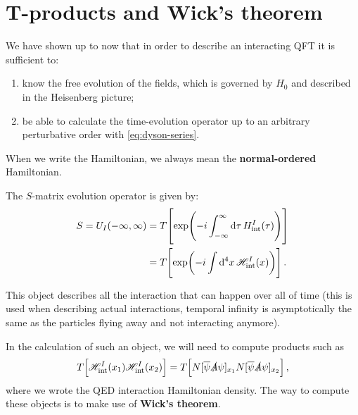 \documentclass[main.tex]{subfiles}
\begin{document}
\section{T-products and Wick's theorem}


We have shown up to now that in order to describe an interacting QFT it is sufficient to: 
\begin{enumerate}
    \item know the free evolution of the fields, which is governed by \(H_0 \) and described in the Heisenberg picture;
    \item be able to calculate the time-evolution operator up to an arbitrary perturbative order with \eqref{eq:dyson-series}. 
\end{enumerate}

When we write the Hamiltonian, we always mean the \textbf{normal-ordered} Hamiltonian. 

\begin{definition}
The \(S\)-matrix evolution operator is given by:
%
\begin{subequations} \label{eq:s-matrix}
\begin{align}
S = U_I (- \infty , \infty )
&= T \qty[\exp(-i \int_{- \infty }^{\infty } \dd{\tau }H _{\text{int}}^{I} (\tau ))]  \\
&= T \qty[\exp(-i \int \dd[4]{x} \mathscr{H} _{\text{int}}^{I} (x))]
\,.
\end{align}
\end{subequations}
\end{definition}

This object describes all the interaction that can happen over all of time (this is used when describing actual interactions, temporal infinity is asymptotically the same as the particles flying away and not interacting anymore).

In the calculation of such an object, we will need to compute products such as 
%
\begin{align}
T \qty[\mathscr{H} _{\text{int}}^{I}(x_1 ) \mathscr{H} _{\text{int}}^{I}(x_2 )] 
= T \qty[ N[\overline{\psi} \slashed{A} \psi ]_{x_1 }N[\overline{\psi} \slashed{A} \psi ]_{x_2 }]
\,,
\end{align}
%
where we wrote the QED interaction Hamiltonian density. The way to compute these objects is to make use of \textbf{Wick's theorem}. 
\end{document}
